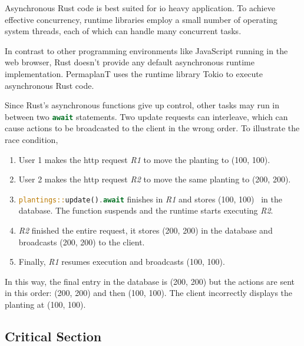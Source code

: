 \documentclass[final,oneside]{vutinfth}
\newcommand{\rustsnippet}[1]{\lstinline[language=rust]{#1}}
\begin{document}
Asynchronous Rust code is best suited for \gls{io} heavy application.
To achieve effective concurrency, runtime libraries employ a small number of operating system threads, each of which can handle many concurrent tasks\cite{rustasyncbookchapter}. 

In contrast to other programming environments like JavaScript running in the web browser\cite{mdnjavascripteventloop}, Rust doesn't provide any default asynchronous runtime implementation.
PermaplanT uses the runtime library Tokio \cite{tokiocrate} to execute asynchronous Rust code.

Since Rust's asynchronous functions give up control, other tasks may run in between two \rustsnippet{await} statements.
Two update requests can interleave, which can cause actions to be broadcasted to the client in the wrong order.
To illustrate the race condition,
\begin{enumerate}
    \item User 1 makes the \gls{http} request \textit{R1} to move the planting to (100, 100).
    \item User 2 makes the \gls{http} request \textit{R2} to move the same planting to (200, 200).
    \item \rustsnippet{plantings::update().await} finishes in \textit{R1} and stores (100, 100) \
    in the database. The function suspends and the runtime starts executing \textit{R2}.
    \item \textit{R2} finished the entire request, it stores (200, 200) in the database and broadcasts (200, 200) to the client.
    \item Finally, \textit{R1} resumes execution and broadcasts (100, 100).
\end{enumerate}

In this way, the final entry in the database is (200, 200) but the actions are sent in this order: (200, 200) and then (100, 100).
The client incorrectly displays the planting at (100, 100).

\subsection{Critical Section}
\end{document}
